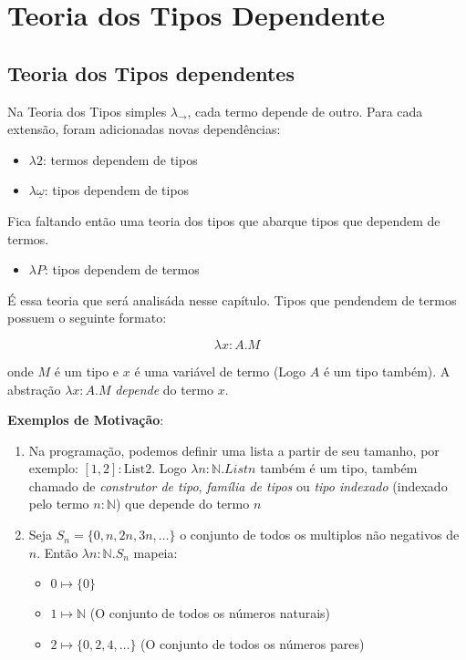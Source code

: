 \documentclass[../main.tex]{subfiles}
\begin{document}
\section{Teoria dos Tipos Dependente}

\subsection{Teoria dos Tipos dependentes}

Na Teoria dos Tipos simples $\lambda_{\to}$, cada termo depende de outro. Para cada extensão, foram adicionadas novas dependências:

\begin{itemize}
    \item $\lambda2$: termos dependem de tipos
    \item $\lambda\underline{\omega}$: tipos dependem de tipos
\end{itemize}

Fica faltando então uma teoria dos tipos que abarque tipos que dependem de termos.

\begin{itemize}
    \item $\lambda P$: tipos dependem de termos
\end{itemize}

É essa teoria que será analisáda nesse capítulo. Tipos que pendendem de termos possuem o seguinte formato:

$$\lambda x : A . M$$

onde $M$ é um tipo e $x$ é uma variável de termo (Logo $A$ é um tipo também). A abstração $\lambda x : A . M$ \emph{depende} do termo $x$.

\textbf{Exemplos de Motivação}:

\begin{enumerate}[label=(\arabic*)]
    \item Na programação, podemos definir uma lista a partir de seu tamanho, por exemplo: $[1, 2] : \text{List}2$. Logo $\lambda n : \mathbb{N} . List n$ também é um tipo, também chamado de \emph{construtor de tipo}, \emph{família de tipos} ou \emph{tipo indexado} (indexado pelo termo $n : \mathbb{N}$) que depende do termo $n$
    \item Seja $S_n = \{0, n, 2n, 3n, \dots\}$ o conjunto de todos os multiplos não negativos de $n$. Então $\lambda n : \mathbb{N} . S_n$ mapeia:
    \begin{itemize}[label=-]
        \item $0 \mapsto \{0\}$
        \item $1 \mapsto \mathbb{N}$ (O conjunto de todos os números naturais)
        \item $2 \mapsto \{0, 2, 4, \dots\}$ (O conjunto de todos os números pares)
    \end{itemize}
\end{enumerate}
\end{document}
